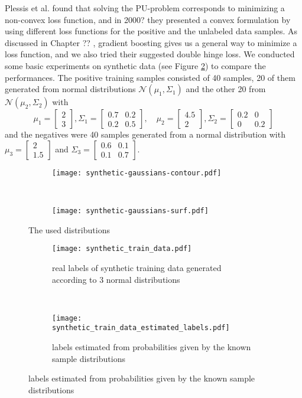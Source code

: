 Plessis et al.  found that solving the PU-problem corresponds to minimizing a non-convex loss function, and in 2000?  they presented a convex formulation by using different loss functions for the positive and the unlabeled data samples. As discussed in Chapter ?? , gradient boosting gives us a general way to minimize a loss function, and we also tried their suggested double hinge loss. We conducted some basic experiments on synthetic data (see Figure \ref{fig:synthetic_train_data}) to compare the performances. The positive training samples consisted of 40 samples, 20 of them generated from normal distributions $\mathcal{N}(\mu_1,\Sigma_1)$ and the other 20 from $\mathcal{N}(\mu_2, \Sigma_2)$ with 
$$\mu_1= \begin{bmatrix}2 \\ 3 \end{bmatrix}, \Sigma_1 = \begin{bmatrix}0.7 & 0.2 \\ 0.2 & 0.5 \end{bmatrix}, \quad \mu_2 = \begin{bmatrix}4.5 \\ 2 \end{bmatrix}, \Sigma_2 = \begin{bmatrix} 0.2 & 0 \\ 0 & 0.2 \end{bmatrix}$$
and the negatives were 40 samples generated from a normal distribution with $\mu_3 = \begin{bmatrix} 2\\1.5\end{bmatrix}$  and $\Sigma_3 = \begin{bmatrix}0.6 & 0.1\\ 0.1 & 0.7\end{bmatrix}.$


\begin{figure}[ht]
	\centering
	\begin{subfigure}[h]{0.45\textwidth}
	\texttt{[image: synthetic-gaussians-contour.pdf]}	
	\end{subfigure}
	~
	\begin{subfigure}[h]{0.45\textwidth}
	\texttt{[image: synthetic-gaussians-surf.pdf]}	
	\end{subfigure}
	\caption{The used distributions}
	\label{fig:synthetic-gaussians}
\end{figure}

\begin{figure}[ht]
	\centering
	\begin{subfigure}[h]{0.45\textwidth}
	\texttt{[image: synthetic\_train\_data.pdf]}	
		\caption*{real labels of synthetic training data generated according to 3 normal distributions}
	\end{subfigure}
	~
	\begin{subfigure}[h]{0.45\textwidth}
	\texttt{[image: synthetic\_train\_data\_estimated\_labels.pdf]}	
		\caption*{labels estimated from probabilities given by the known sample distributions}
	\end{subfigure}
	\label{fig:synthetic_train_data}
\end{figure}

